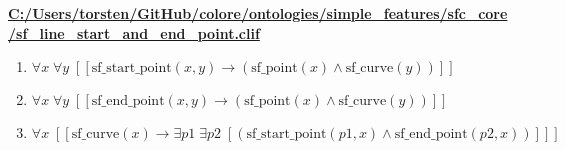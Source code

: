 \documentclass{article}
\begin{document}
\textbf{\url{C:/Users/torsten/GitHub/colore/ontologies/simple\_features/sfc\_core/sf\_line\_start\_and\_end\_point.clif}}

\begin{enumerate}
\item $\forall x\; \forall y\;  \left[ \left[ \textrm{sf\_start\_point}(x,y) \rightarrow \left(\textrm{sf\_point}(x) \land \textrm{sf\_curve}(y)\right) \right] \right]$
\item $\forall x\; \forall y\;  \left[ \left[ \textrm{sf\_end\_point}(x,y) \rightarrow \left(\textrm{sf\_point}(x) \land \textrm{sf\_curve}(y)\right) \right] \right]$
\item $\forall x\;  \left[ \left[ \textrm{sf\_curve}(x) \rightarrow \exists p1\; \exists p2\;  \left[ \left(\textrm{sf\_start\_point}(p1,x) \land \textrm{sf\_end\_point}(p2,x)\right) \right] \right] \right]$
\end{enumerate}
\end{document}
